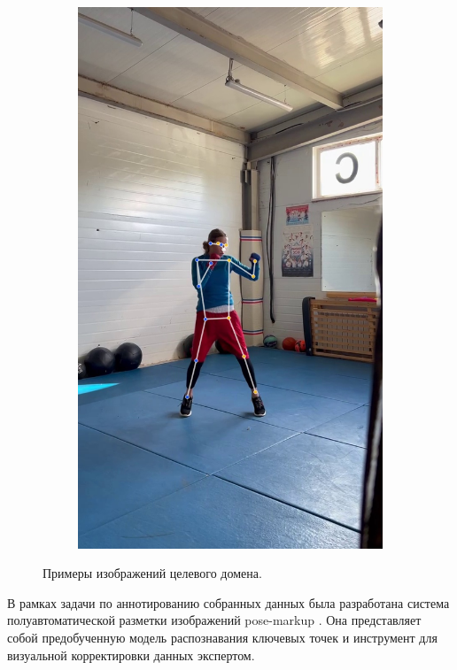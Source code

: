 \begin{figure}[h]
\begin{subfigure}[b]{0.24\textwidth}
	\includegraphics[width=\textwidth]{./images/experiment/data_info/box_examples/ex_0}
\end{subfigure}
\caption{Примеры изображений целевого домена.}
\label{fig:target_examples}
\end{figure}

В рамках задачи по аннотированию собранных данных была разработана система полуавтоматической разметки изображений pose-markup \cite{pose_markup}. Она представляет собой предобученную модель распознавания ключевых точек и инструмент для визуальной корректировки данных экспертом.

